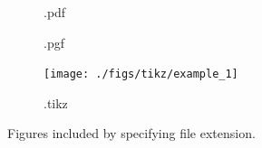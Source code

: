 \begin{figure}
\begin{subfigure}[t]{0.45\textwidth}
        \caption{.pdf}
        \label{figures:fig:exmaple:2:pdf}
        \end{subfigure}
        \begin{subfigure}[t]{0.45\textwidth}
        \resizebox*{\linewidth}{!}{}
        \caption{.pgf}
        \label{figures:fig:exmaple:2:pgf}
         \end{subfigure} 
        \hfill     
        \begin{subfigure}[t]{0.45\textwidth}
        \texttt{[image: ./figs/tikz/example\_1]}
        \caption{.tikz}
        \label{figures:fig:exmaple:2:tikz}
        \end{subfigure}     
        \caption{Figures included by specifying file extension.}   
        \label{figures:fig:example:2}
    \end{figure}
